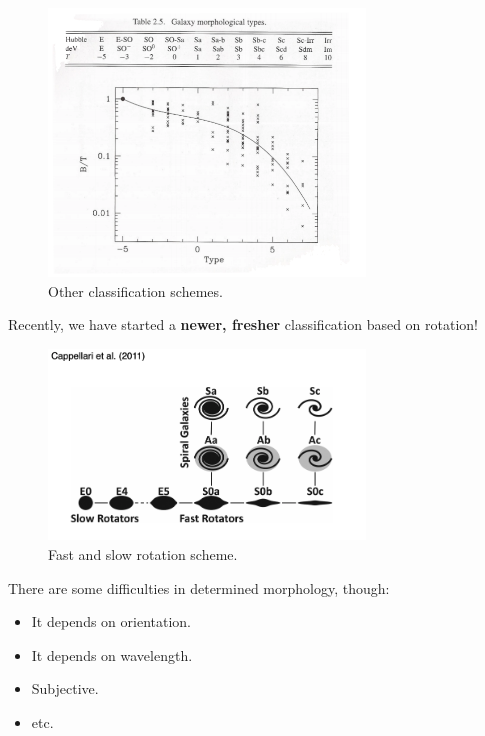 \documentclass{article}
\begin{document}
\begin{figure}[ht!]
    \centering
    \includegraphics[width=0.75\textwidth]{figs/Screen Shot 2021-08-27 at 1.37.01 PM.png}
    \caption{Other classification schemes. }
    \label{fig:other_schemes}
\end{figure}

Recently, we have started a \textbf{newer, fresher} classification based on rotation! 

\begin{figure}[ht!]
    \centering
    \includegraphics[width=0.75\textwidth]{figs/Screen Shot 2021-08-27 at 1.38.11 PM.png}
    \caption{Fast and slow rotation scheme. }
    \label{fig:fast_slow_rot}
\end{figure}

There are some difficulties in determined morphology, though:
\begin{itemize}
    \item It depends on orientation.
    \item It depends on wavelength. 
    \item Subjective.
    \item etc.
\end{itemize}
\end{document}
